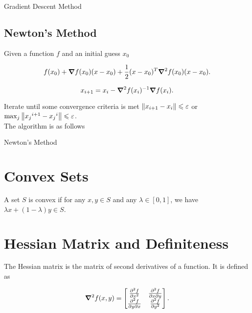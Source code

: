 \documentclass{report}
\begin{document}
\begin{algorithm}
	\SetAlgoLined
	\caption{Gradient Descent Method}
\end{algorithm}

\subsection{Newton's Method}

Given a function $f$ and an initial guess $x_0$

\[
	f(x_0) + \grad{f(x_0)(x-x_0)} + \frac{1}{2}(x-x_0)^T\grad^2f(x_0)(x-x_0)
	.\]

\[
	x_{i+1} = x_i - \grad^2f(x_i)^{-1}\grad{f(x_i)}
	.\]

Iterate until some convergence criteria is met $\norm{x_{i+1} - x_i} \leqslant \varepsilon$ or $\max_j \norm{{x_j}^{i+1} - {x_j}^i} \leqslant \varepsilon$.\\

The algorithm is as follows

\begin{algorithm}
	\SetAlgoLined
	\caption{Newton's Method}
\end{algorithm}

\section{Convex Sets}

A set $S$ is convex if for any $x,y\in S$ and any $\lambda\in[0,1]$, we have $\lambda x + (1-\lambda)y\in S$.

\section{Hessian Matrix and Definiteness}

The Hessian matrix is the matrix of second derivatives of a function. It is defined as

\[
	\grad^2f(x,y) = \begin{bmatrix}
		\pdv[2]{f}{x} & \pdv{f}{x}{y} \\
		\pdv{f}{y}{x} & \pdv[2]{f}{y}
	\end{bmatrix}
	.\]
\end{document}
